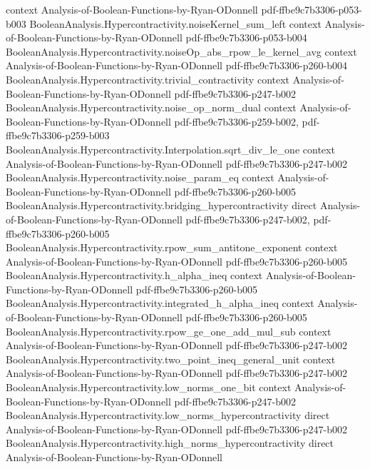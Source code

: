\begin{theorem}
  {context}
  {Analysis-of-Boolean-Functions-by-Ryan-ODonnell}
  {pdf-ffbe9c7b3306-p053-b003}
\proofstep
  {BooleanAnalysis.Hypercontractivity.noiseKernel_sum_left}
  {context}
  {Analysis-of-Boolean-Functions-by-Ryan-ODonnell}
  {pdf-ffbe9c7b3306-p053-b004}
\proofstep
  {BooleanAnalysis.Hypercontractivity.noiseOp_abs_rpow_le_kernel_avg}
  {context}
  {Analysis-of-Boolean-Functions-by-Ryan-ODonnell}
  {pdf-ffbe9c7b3306-p260-b004}
\proofstep
  {BooleanAnalysis.Hypercontractivity.trivial_contractivity}
  {context}
  {Analysis-of-Boolean-Functions-by-Ryan-ODonnell}
  {pdf-ffbe9c7b3306-p247-b002}
\proofstep
  {BooleanAnalysis.Hypercontractivity.noise_op_norm_dual}
  {context}
  {Analysis-of-Boolean-Functions-by-Ryan-ODonnell}
  {pdf-ffbe9c7b3306-p259-b002,
    pdf-ffbe9c7b3306-p259-b003}
\proofstep
  {BooleanAnalysis.Hypercontractivity.Interpolation.sqrt_div_le_one}
  {context}
  {Analysis-of-Boolean-Functions-by-Ryan-ODonnell}
  {pdf-ffbe9c7b3306-p247-b002}
\proofstep
  {BooleanAnalysis.Hypercontractivity.noise_param_eq}
  {context}
  {Analysis-of-Boolean-Functions-by-Ryan-ODonnell}
  {pdf-ffbe9c7b3306-p260-b005}
\proofstep
  {BooleanAnalysis.Hypercontractivity.bridging_hypercontractivity}
  {direct}
  {Analysis-of-Boolean-Functions-by-Ryan-ODonnell}
  {pdf-ffbe9c7b3306-p247-b002,
    pdf-ffbe9c7b3306-p260-b005}
\proofstep
  {BooleanAnalysis.Hypercontractivity.rpow_sum_antitone_exponent}
  {context}
  {Analysis-of-Boolean-Functions-by-Ryan-ODonnell}
  {pdf-ffbe9c7b3306-p260-b005}
\proofstep
  {BooleanAnalysis.Hypercontractivity.h_alpha_ineq}
  {context}
  {Analysis-of-Boolean-Functions-by-Ryan-ODonnell}
  {pdf-ffbe9c7b3306-p260-b005}
\proofstep
  {BooleanAnalysis.Hypercontractivity.integrated_h_alpha_ineq}
  {context}
  {Analysis-of-Boolean-Functions-by-Ryan-ODonnell}
  {pdf-ffbe9c7b3306-p260-b005}
\proofstep
  {BooleanAnalysis.Hypercontractivity.rpow_ge_one_add_mul_sub}
  {context}
  {Analysis-of-Boolean-Functions-by-Ryan-ODonnell}
  {pdf-ffbe9c7b3306-p247-b002}
\proofstep
  {BooleanAnalysis.Hypercontractivity.two_point_ineq_general_unit}
  {context}
  {Analysis-of-Boolean-Functions-by-Ryan-ODonnell}
  {pdf-ffbe9c7b3306-p247-b002}
\proofstep
  {BooleanAnalysis.Hypercontractivity.low_norms_one_bit}
  {context}
  {Analysis-of-Boolean-Functions-by-Ryan-ODonnell}
  {pdf-ffbe9c7b3306-p247-b002}
\proofstep
  {BooleanAnalysis.Hypercontractivity.low_norms_hypercontractivity}
  {direct}
  {Analysis-of-Boolean-Functions-by-Ryan-ODonnell}
  {pdf-ffbe9c7b3306-p247-b002}
\proofstep
  {BooleanAnalysis.Hypercontractivity.high_norms_hypercontractivity}
  {direct}
  {Analysis-of-Boolean-Functions-by-Ryan-ODonnell}

\end{theorem}
